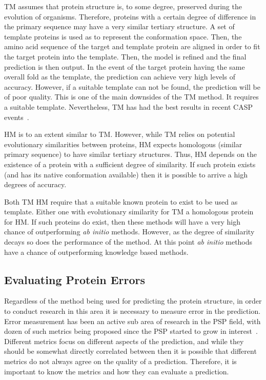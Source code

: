 \ac{TM} assumes that protein structure is, to some degree, preserved during the
evolution of organisms. Therefore, proteins with a certain degree of difference
in the primary sequence may have a very similar tertiary structure. A set of
template proteins is used as to represent the conformation space. Then, the
amino acid sequence of the target and template protein are aligned in order to
fit the target protein into the template. Then, the model is refined and the
final prediction is then output. In the event of the target protein having the
same overall fold as the template, the prediction can achieve very high levels
of accuracy. However, if a suitable template can not be found, the prediction
will be of poor quality. This is one of the main downsides of the \ac{TM}
method. It requires a suitable template. Nevertheless, \ac{TM} has had the best
results in recent \ac{CASP} events~\cite{moult2018critical}.

\ac{HM} is to an extent similar to \ac{TM}. However, while \ac{TM} relies on
potential evolutionary similarities between proteins, HM expects homologous
(similar primary sequence) to have similar tertiary structures. Thus, HM
depends on the existence of a protein with a sufficient degree of similarity.
If such protein exists (and has its native conformation available) then it is
possible to arrive a high degrees of accuracy.

Both \ac{TM} HM require that a suitable known protein to exist to be used as
template. Either one with evolutionary similarity for \ac{TM} a homologous
protein for HM. If such proteins do exist, then these methods will have a very
high chance of outperforming \textit{ab initio} methods. However, as the degree
of similarity decays so does the performance of the method. At this point
\textit{ab initio} methods have a chance of outperforming knowledge based
methods.

\subsection{Evaluating Protein Errors}\label{sec:protein-metrics}

Regardless of the method being used for predicting the protein structure, in
order to conduct research in this area it is necessary to measure error in the
prediction. Error measurement has been an active sub area of research in the
\ac{PSP} field, with dozen of such metrics being proposed since the \ac{PSP}
started to grow in
interest~\cite{xu2010significant,zhang2005tm,siew2000maxsub}.  Different
metrics focus on different aspects of the prediction, and while they should be
somewhat directly correlated between then it is possible that different metrics
do not always agree on the quality of a prediction. Therefore, it is important
to know the metrics and how they can evaluate a prediction.

